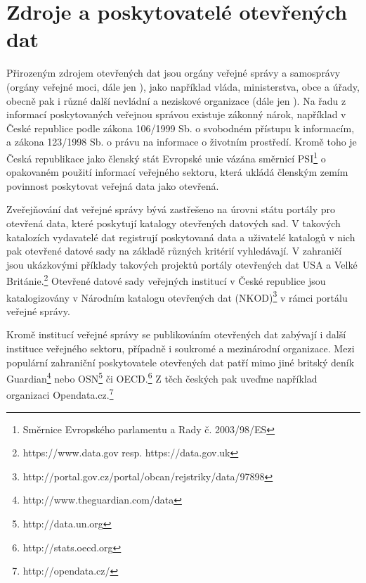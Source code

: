 \section{Zdroje a poskytovatelé otevřených dat}
Přirozeným zdrojem otevřených dat jsou orgány veřejné správy a samosprávy (orgány veřejné moci, dále jen ), jako například vláda, ministerstva, obce a úřady, obecně pak i různé další nevládní a neziskové organizace (dále jen ). Na řadu z informací poskytovaných veřejnou správou existuje zákonný nárok, například v České republice podle zákona 106/1999 Sb. o svobodném přístupu k informacím, a zákona 123/1998 Sb. o právu na informace o životním prostředí. Kromě toho je Česká republikace jako členský stát Evropské unie vázána směrnicí PSI\footnote{Směrnice Evropského parlamentu a Rady č. 2003/98/ES} o opakovaném použití informací veřejného sektoru, která ukládá členským zemím povinnost poskytovat veřejná data jako otevřená.

Zveřejňování dat veřejné správy bývá zastřešeno na úrovni státu portály pro otevřená data, které poskytují katalogy otevřených datových sad. V takových katalozích vydavatelé dat registrují poskytovaná data a uživatelé katalogů v nich pak otevřené datové sady na základě různých kritérií vyhledávají. V zahraničí jsou ukázkovými příklady takových projektů portály otevřených dat USA a Velké Británie.\footnote{https://www.data.gov resp. https://data.gov.uk} Otevřené datové sady veřejných institucí v České republice jsou katalogizovány v Národním katalogu otevřených dat (NKOD)\footnote{http://portal.gov.cz/portal/obcan/rejstriky/data/97898} v rámci portálu veřejné správy.

Kromě institucí veřejné správy se publikováním otevřených dat zabývají i další instituce veřejného sektoru, případně i soukromé a mezinárodní organizace. Mezi populární zahraniční poskytovatele otevřených dat patří mimo jiné britský deník Guardian\footnote{http://www.theguardian.com/data} nebo OSN\footnote{http://data.un.org} či OECD.\footnote{http://stats.oecd.org} Z těch českých pak uveďme například organizaci Opendata.cz.\footnote{http://opendata.cz/}


